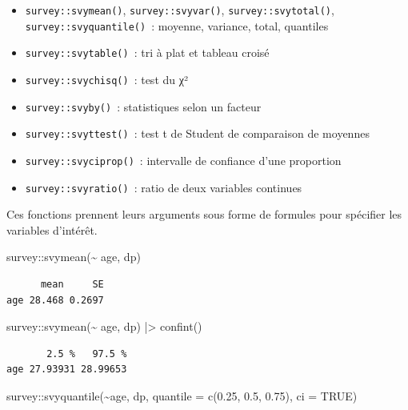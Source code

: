 \documentclass[
  letterpaper,
  DIV=11,
  numbers=noendperiod,
  oneside]{scrreprt}
\newenvironment{Shaded}{\begin{snugshade}}{\end{snugshade}}
\newcommand{\AttributeTok}[1]{\textcolor[rgb]{0.40,0.45,0.13}{#1}}
\newcommand{\ConstantTok}[1]{\textcolor[rgb]{0.56,0.35,0.01}{#1}}
\newcommand{\FloatTok}[1]{\textcolor[rgb]{0.68,0.00,0.00}{#1}}
\newcommand{\FunctionTok}[1]{\textcolor[rgb]{0.28,0.35,0.67}{#1}}
\newcommand{\NormalTok}[1]{\textcolor[rgb]{0.00,0.23,0.31}{#1}}
\newcommand{\SpecialCharTok}[1]{\textcolor[rgb]{0.37,0.37,0.37}{#1}}
\begin{document}
\begin{itemize}
\item
  \texttt{survey::svymean()}, \texttt{survey::svyvar()},
  \texttt{survey::svytotal()}, \texttt{survey::svyquantile()}~: moyenne,
  variance, total, quantiles
\item
  \texttt{survey::svytable()}~: tri à plat et tableau croisé
\item
  \texttt{survey::svychisq()}~: test du χ²
\item
  \texttt{survey::svyby()}~: statistiques selon un facteur
\item
  \texttt{survey::svyttest()}~: test t de Student de comparaison de
  moyennes
\item
  \texttt{survey::svyciprop()}~: intervalle de confiance d'une
  proportion
\item
  \texttt{survey::svyratio()}~: ratio de deux variables continues
\end{itemize}

Ces fonctions prennent leurs arguments sous forme de formules pour
spécifier les variables d'intérêt.

\begin{Shaded}
\begin{Highlighting}[]
\NormalTok{survey}\SpecialCharTok{::}\FunctionTok{svymean}\NormalTok{(}\SpecialCharTok{\textasciitilde{}}\NormalTok{ age, dp)}
\end{Highlighting}
\end{Shaded}

\begin{verbatim}
      mean     SE
age 28.468 0.2697
\end{verbatim}

\begin{Shaded}
\begin{Highlighting}[]
\NormalTok{survey}\SpecialCharTok{::}\FunctionTok{svymean}\NormalTok{(}\SpecialCharTok{\textasciitilde{}}\NormalTok{ age, dp) }\SpecialCharTok{|\textgreater{}} \FunctionTok{confint}\NormalTok{()}
\end{Highlighting}
\end{Shaded}

\begin{verbatim}
       2.5 %   97.5 %
age 27.93931 28.99653
\end{verbatim}

\begin{Shaded}
\begin{Highlighting}[]
\NormalTok{survey}\SpecialCharTok{::}\FunctionTok{svyquantile}\NormalTok{(}\SpecialCharTok{\textasciitilde{}}\NormalTok{age, dp, }\AttributeTok{quantile =} \FunctionTok{c}\NormalTok{(}\FloatTok{0.25}\NormalTok{, }\FloatTok{0.5}\NormalTok{, }\FloatTok{0.75}\NormalTok{), }\AttributeTok{ci =} \ConstantTok{TRUE}\NormalTok{)}
\end{Highlighting}
\end{Shaded}
\end{document}
